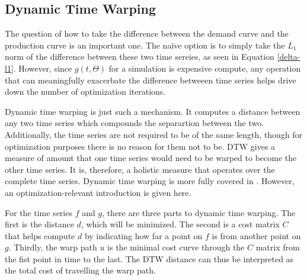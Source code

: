 \subsection{Dynamic Time Warping}
\label{dtw}

The question of how to take the difference between the demand curve and 
the production curve is an important one. The na\"ive option is to simply 
take the $L_1$ norm of the difference between these two time sereies, as 
seen in Equation \ref{delta-l1}.  However, since $g(t, \Theta)$ for 
a simulation is expensive compute, any operation that can meaningfully 
exacerbate the difference betweeen time series helps drive down the number 
of optimization iterations.

Dynamic time warping is just such a mechanism. It computes 
a distance between any two time series which compounds the separartion 
between the two. Additionally, the time series are not required to be of the 
same length, though for optimization purposes there is no reason for them 
not to be. DTW gives a measure of amount that one time series would need to 
be warped to become the other time series. It is, therefore, a holistic  
measure that operates over the complete time series. Dynamic time warping
is more fully covered in \cite{muller}.  However, an 
optimization-relevant introduction is given here.

For the time series $f$ and $g$, there are three parts to dynamic time 
warping. The first is the distance $d$, which will be minimized. The second 
is a cost matrix $C$ that helps compute $d$ by indicating how far a point 
on $f$ is from another point on $g$. Thirdly, the warp path $u$ is the 
minimal cost curve through the $C$ matrix from the fist point in time to 
the last. The DTW distance can thus be interpreted as the 
total cost of travelling the warp path.

